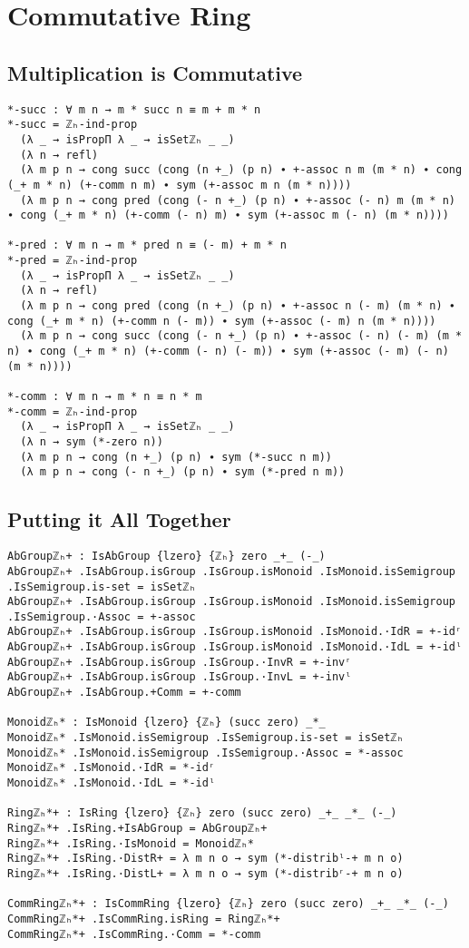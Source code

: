 \chapter{Commutative Ring}
\label{ch:commring}

\section{Multiplication is Commutative}
\begin{verbatim}
*-succ : ∀ m n → m * succ n ≡ m + m * n
*-succ = ℤₕ-ind-prop
  (λ _ → isPropΠ λ _ → isSetℤₕ _ _)
  (λ n → refl)
  (λ m p n → cong succ (cong (n +_) (p n) ∙ +-assoc n m (m * n) ∙ cong (_+ m * n) (+-comm n m) ∙ sym (+-assoc m n (m * n))))
  (λ m p n → cong pred (cong (- n +_) (p n) ∙ +-assoc (- n) m (m * n) ∙ cong (_+ m * n) (+-comm (- n) m) ∙ sym (+-assoc m (- n) (m * n))))

*-pred : ∀ m n → m * pred n ≡ (- m) + m * n
*-pred = ℤₕ-ind-prop
  (λ _ → isPropΠ λ _ → isSetℤₕ _ _)
  (λ n → refl)
  (λ m p n → cong pred (cong (n +_) (p n) ∙ +-assoc n (- m) (m * n) ∙ cong (_+ m * n) (+-comm n (- m)) ∙ sym (+-assoc (- m) n (m * n))))
  (λ m p n → cong succ (cong (- n +_) (p n) ∙ +-assoc (- n) (- m) (m * n) ∙ cong (_+ m * n) (+-comm (- n) (- m)) ∙ sym (+-assoc (- m) (- n) (m * n))))

*-comm : ∀ m n → m * n ≡ n * m
*-comm = ℤₕ-ind-prop
  (λ _ → isPropΠ λ _ → isSetℤₕ _ _)
  (λ n → sym (*-zero n))
  (λ m p n → cong (n +_) (p n) ∙ sym (*-succ n m))
  (λ m p n → cong (- n +_) (p n) ∙ sym (*-pred n m))
\end{verbatim}

\section{Putting it All Together}
\begin{verbatim}
AbGroupℤₕ+ : IsAbGroup {lzero} {ℤₕ} zero _+_ (-_)
AbGroupℤₕ+ .IsAbGroup.isGroup .IsGroup.isMonoid .IsMonoid.isSemigroup .IsSemigroup.is-set = isSetℤₕ
AbGroupℤₕ+ .IsAbGroup.isGroup .IsGroup.isMonoid .IsMonoid.isSemigroup .IsSemigroup.·Assoc = +-assoc
AbGroupℤₕ+ .IsAbGroup.isGroup .IsGroup.isMonoid .IsMonoid.·IdR = +-idʳ
AbGroupℤₕ+ .IsAbGroup.isGroup .IsGroup.isMonoid .IsMonoid.·IdL = +-idˡ
AbGroupℤₕ+ .IsAbGroup.isGroup .IsGroup.·InvR = +-invʳ
AbGroupℤₕ+ .IsAbGroup.isGroup .IsGroup.·InvL = +-invˡ
AbGroupℤₕ+ .IsAbGroup.+Comm = +-comm

Monoidℤₕ* : IsMonoid {lzero} {ℤₕ} (succ zero) _*_
Monoidℤₕ* .IsMonoid.isSemigroup .IsSemigroup.is-set = isSetℤₕ
Monoidℤₕ* .IsMonoid.isSemigroup .IsSemigroup.·Assoc = *-assoc
Monoidℤₕ* .IsMonoid.·IdR = *-idʳ
Monoidℤₕ* .IsMonoid.·IdL = *-idˡ

Ringℤₕ*+ : IsRing {lzero} {ℤₕ} zero (succ zero) _+_ _*_ (-_)
Ringℤₕ*+ .IsRing.+IsAbGroup = AbGroupℤₕ+
Ringℤₕ*+ .IsRing.·IsMonoid = Monoidℤₕ*
Ringℤₕ*+ .IsRing.·DistR+ = λ m n o → sym (*-distribˡ-+ m n o)
Ringℤₕ*+ .IsRing.·DistL+ = λ m n o → sym (*-distribʳ-+ m n o)

CommRingℤₕ*+ : IsCommRing {lzero} {ℤₕ} zero (succ zero) _+_ _*_ (-_)
CommRingℤₕ*+ .IsCommRing.isRing = Ringℤₕ*+
CommRingℤₕ*+ .IsCommRing.·Comm = *-comm
\end{verbatim}

